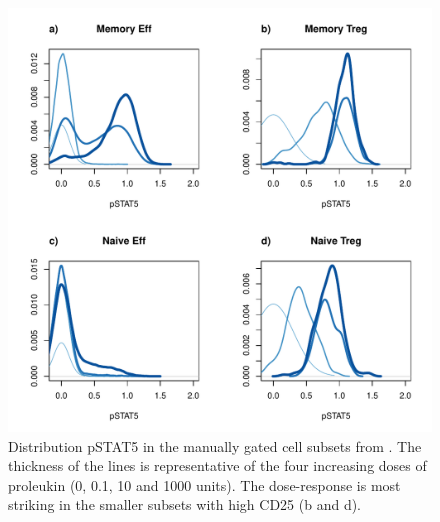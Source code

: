 \hspace{-2cm}
\begin{figure}[h]
\centering
\includegraphics[scale=.45]{IL2/figures/dose-effect-pstat5-cellsubsets-density-baseline.pdf}
{ Distribution pSTAT5 in the manually gated cell subsets from . }
{
The thickness of the lines is representative of the four increasing doses of proleukin (0, 0.1, 10 and 1000 units).
The dose-response is most striking in the smaller subsets with high CD25 (b and d).
}
\end{figure}

%
%



